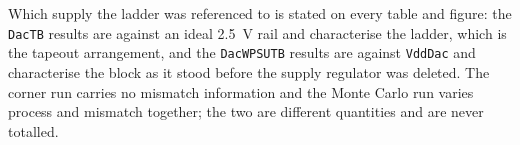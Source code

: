 Which supply the ladder was referenced to is stated on every table and figure: the
\texttt{DacTB} results are against an ideal \SI{2.5}{\volt} rail and characterise the
ladder, which is the tapeout arrangement, and the \texttt{DacWPSUTB} results are against
\texttt{VddDac} and characterise the block as it stood before the supply regulator was
deleted. The corner run carries no mismatch information and the Monte
Carlo run varies process and mismatch together; the two are different quantities and are
never totalled.
